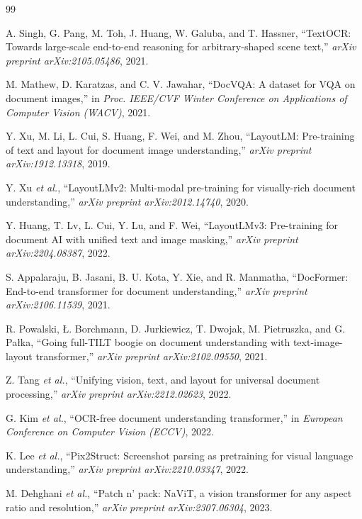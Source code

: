 \documentclass[conference]{IEEEtran}
\begin{document}
\begin{thebibliography}{99}

 A. Singh, G. Pang, M. Toh, J. Huang, W. Galuba, and T. Hassner, ``TextOCR: Towards large-scale end-to-end reasoning for arbitrary-shaped scene text,'' \emph{arXiv preprint arXiv:2105.05486}, 2021.

 M. Mathew, D. Karatzas, and C. V. Jawahar, ``DocVQA: A dataset for VQA on document images,'' in \emph{Proc. IEEE/CVF Winter Conference on Applications of Computer Vision (WACV)}, 2021.

 Y. Xu, M. Li, L. Cui, S. Huang, F. Wei, and M. Zhou, ``LayoutLM: Pre-training of text and layout for document image understanding,'' \emph{arXiv preprint arXiv:1912.13318}, 2019.

 Y. Xu \emph{et al.}, ``LayoutLMv2: Multi-modal pre-training for visually-rich document understanding,'' \emph{arXiv preprint arXiv:2012.14740}, 2020.

 Y. Huang, T. Lv, L. Cui, Y. Lu, and F. Wei, ``LayoutLMv3: Pre-training for document AI with unified text and image masking,'' \emph{arXiv preprint arXiv:2204.08387}, 2022.

 S. Appalaraju, B. Jasani, B. U. Kota, Y. Xie, and R. Manmatha, ``DocFormer: End-to-end transformer for document understanding,'' \emph{arXiv preprint arXiv:2106.11539}, 2021.

 R. Powalski, \L. Borchmann, D. Jurkiewicz, T. Dwojak, M. Pietruszka, and G. Pa\l{}ka, ``Going full-TILT boogie on document understanding with text-image-layout transformer,'' \emph{arXiv preprint arXiv:2102.09550}, 2021.

 Z. Tang \emph{et al.}, ``Unifying vision, text, and layout for universal document processing,'' \emph{arXiv preprint arXiv:2212.02623}, 2022.

 G. Kim \emph{et al.}, ``OCR-free document understanding transformer,'' in \emph{European Conference on Computer Vision (ECCV)}, 2022.

 K. Lee \emph{et al.}, ``Pix2Struct: Screenshot parsing as pretraining for visual language understanding,'' \emph{arXiv preprint arXiv:2210.03347}, 2022.

 M. Dehghani \emph{et al.}, ``Patch n' pack: NaViT, a vision transformer for any aspect ratio and resolution,'' \emph{arXiv preprint arXiv:2307.06304}, 2023.


\end{thebibliography}
\end{document}
